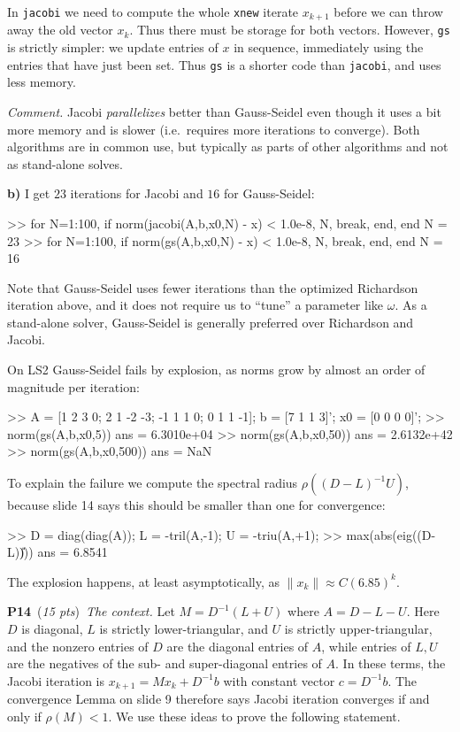 \documentclass[11pt]{amsart}
\newcommand{\probpts}[2]{\bigskip\noindent\large \textbf{#1} \normalsize \,(\emph{#2})\,}
\newcommand{\epart}[1]{\medskip\noindent\textbf{#1)}}
\begin{document}
In \texttt{jacobi} we need to compute the whole \texttt{xnew} iterate $x_{k+1}$ before we can throw away the old vector $x_k$.  Thus there must be storage for both vectors.  However, \texttt{gs} is strictly simpler: we update entries of $x$ in sequence, immediately using the entries that have just been set.  Thus \texttt{gs} is a shorter code than \texttt{jacobi}, and uses less memory.

\medskip
\noindent
\emph{Comment.}  Jacobi \emph{parallelizes} better than Gauss-Seidel even though it uses a bit more memory and is slower (i.e.~requires more iterations to converge).  Both algorithms are in common use, but typically as parts of other algorithms and not as stand-alone solves.

\epart{b}  I get $23$ iterations for Jacobi and $16$ for Gauss-Seidel:
\begin{mVerb}
>> for N=1:100, if norm(jacobi(A,b,x0,N) - x) < 1.0e-8, N, break, end, end
N =                   23
>> for N=1:100, if norm(gs(A,b,x0,N) - x) < 1.0e-8, N, break, end, end
N =                   16
\end{mVerb}

Note that Gauss-Seidel uses fewer iterations than the optimized Richardson iteration above, and it does not require us to ``tune'' a parameter like $\omega$.  As a stand-alone solver, Gauss-Seidel is generally preferred over Richardson and Jacobi.

On LS2 Gauss-Seidel fails by explosion, as norms grow by almost an order of magnitude per iteration:
\begin{mVerb}
>> A = [1 2 3 0; 2 1 -2 -3; -1 1 1 0; 0 1 1 -1];  b = [7 1 1 3]';  x0 = [0 0 0 0]';
>> norm(gs(A,b,x0,5))
ans =    6.3010e+04
>> norm(gs(A,b,x0,50))
ans =    2.6132e+42
>> norm(gs(A,b,x0,500))
ans = NaN
\end{mVerb}

To explain the failure we compute the spectral radius $\rho((D-L)^{-1} U)$, because slide 14 says this should be smaller than one for convergence:
\begin{mVerb}
>> D = diag(diag(A));  L = -tril(A,-1);  U = -triu(A,+1);
>> max(abs(eig((D-L)\U)))
ans =  6.8541
\end{mVerb}
The explosion happens, at least asymptotically, as $\|x_k\| \approx C (6.85)^k$.


\probpts{P14}{15 pts}  \emph{The context.}  Let $M = D^{-1}(L+U)$ where $A=D-L-U$.  Here $D$ is diagonal, $L$ is strictly lower-triangular, and $U$ is strictly upper-triangular, and the nonzero entries of $D$ are the diagonal entries of $A$, while entries of $L,U$ are the negatives of the sub- and super-diagonal entries of $A$.  In these terms, the Jacobi iteration is $x_{k+1} = M x_k + D^{-1} b$ with constant vector $c=D^{-1} b$.  The convergence Lemma on slide 9 therefore says Jacobi iteration converges if and only if $\rho(M) < 1$.  We use these ideas to prove the following statement.
\end{document}
